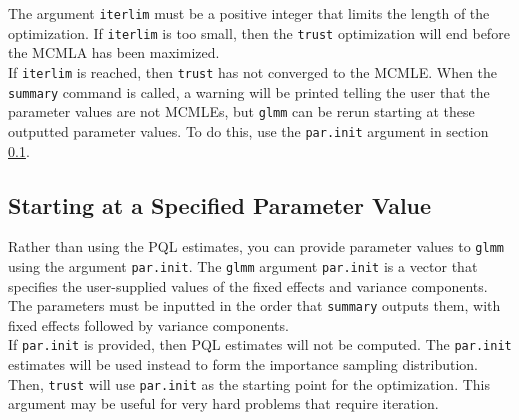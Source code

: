 \documentclass[11pt]{article}\usepackage[]{graphicx}\usepackage[]{color}
\begin{document}
The argument \texttt{iterlim} must be a positive integer that limits the length of the optimization. If \texttt{iterlim} is too small, then the \texttt{trust} optimization will end before the MCMLA has been maximized.\\

If \texttt{iterlim} is reached, then \texttt{trust} has not converged to the MCMLE. When the \texttt{summary} command is called, a warning will be printed telling the user that the parameter values are not MCMLEs, but \texttt{glmm} can be rerun starting at these  outputted parameter values. To do this, use the \texttt{par.init} argument in section \ref{sec:parinit}. \\

\subsection{Starting at a Specified Parameter Value}\label{sec:parinit}
Rather than using the PQL estimates, you can provide parameter values to \texttt{glmm} using the argument \texttt{par.init}. The \texttt{glmm} argument \texttt{par.init} is a vector that specifies the user-supplied values of the fixed effects and variance components. The parameters must be inputted in the order that \texttt{summary} outputs them, with fixed effects followed by variance components.\\

If \texttt{par.init} is provided, then PQL estimates will not be computed. The \texttt{par.init} estimates will be used instead to form the importance sampling distribution. Then, \texttt{trust} will use \texttt{par.init} as the starting point for the optimization. This argument may be useful for very hard problems that require iteration.\\



\end{document}
